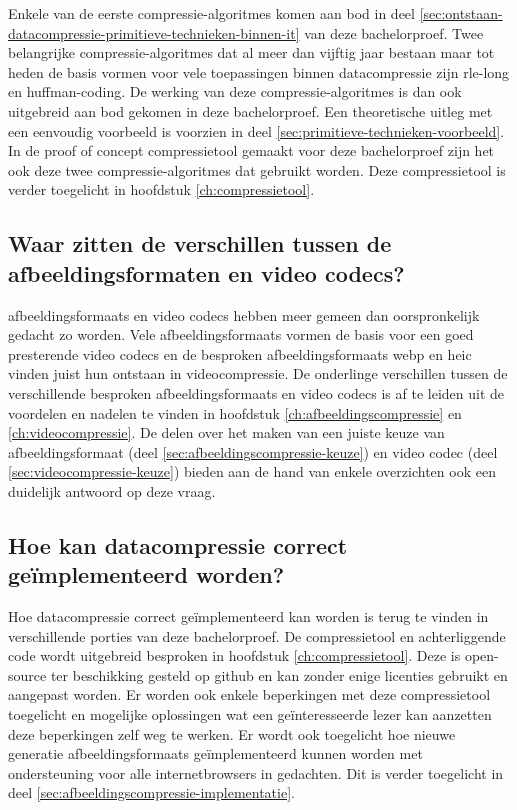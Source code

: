 Enkele van de eerste \glspl{compressie-algoritme} komen aan bod in deel \ref{sec:ontstaan-datacompressie-primitieve-technieken-binnen-it} van deze bachelorproef. Twee belangrijke \glspl{compressie-algoritme} dat al meer dan vijftig jaar bestaan maar tot heden de basis vormen voor vele toepassingen binnen \gls{datacompressie} zijn \gls{rle-long} en \gls{huffman-coding}. De werking van deze \glspl{compressie-algoritme} is dan ook uitgebreid aan bod gekomen in deze bachelorproef. Een theoretische uitleg met een eenvoudig voorbeeld is voorzien in deel \ref{sec:primitieve-technieken-voorbeeld}. In de proof of concept \gls{compressietool} gemaakt voor deze bachelorproef zijn het ook deze twee \glspl{compressie-algoritme} dat gebruikt worden. Deze \gls{compressietool} is verder toegelicht in hoofdstuk \ref{ch:compressietool}.

\subsection*{Waar zitten de verschillen tussen de afbeeldingsformaten en video codecs?}
\label{sec:conclussie-onderzoeksvraag-3}

\Glspl{afbeeldingsformaat} en video \glspl{codec} hebben meer gemeen dan oorspronkelijk gedacht zo worden. Vele \glspl{afbeeldingsformaat} vormen de basis voor een goed presterende video \glspl{codec} en de besproken \glspl{afbeeldingsformaat} \gls{webp} en \gls{heic} vinden juist hun ontstaan in \gls{videocompressie}. De onderlinge verschillen tussen de verschillende besproken \glspl{afbeeldingsformaat} en video \glspl{codec} is af te leiden uit de voordelen en nadelen te vinden in hoofdstuk \ref{ch:afbeeldingscompressie} en \ref{ch:videocompressie}. De delen over het maken van een juiste keuze van \gls{afbeeldingsformaat} (deel \ref{sec:afbeeldingscompressie-keuze}) en video \gls{codec} (deel \ref{sec:videocompressie-keuze}) bieden aan de hand van enkele overzichten ook een duidelijk antwoord op deze vraag.

\subsection*{Hoe kan datacompressie correct geïmplementeerd worden?}
\label{sec:conclussie-onderzoeksvraag-4}

Hoe \gls{datacompressie} correct geïmplementeerd kan worden is terug te vinden in verschillende porties van deze bachelorproef. De \gls{compressietool} en achterliggende code wordt uitgebreid besproken in hoofdstuk \ref{ch:compressietool}. Deze is \gls{open-source} ter beschikking gesteld op \gls{github} en kan zonder enige licenties gebruikt en aangepast worden. Er worden ook enkele beperkingen met deze \gls{compressietool} toegelicht en mogelijke oplossingen wat een geïnteresseerde lezer kan aanzetten deze beperkingen zelf weg te werken. Er wordt ook toegelicht hoe nieuwe generatie \glspl{afbeeldingsformaat} geïmplementeerd kunnen worden met ondersteuning voor alle internetbrowsers in gedachten. Dit is verder toegelicht in deel \ref{sec:afbeeldingscompressie-implementatie}.

